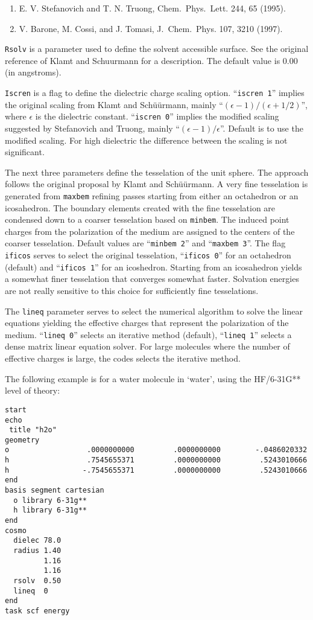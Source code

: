 \begin{enumerate}
\item E. V. Stefanovich and T. N. Truong, Chem.~Phys.~Lett. 244, 65 (1995).
\item V. Barone, M. Cossi, and J. Tomasi, J.~Chem.~Phys. 107, 3210 (1997).
\end{enumerate}

\verb+Rsolv+ is a parameter used to define the solvent accessible
surface. See the original reference of Klamt and Schuurmann for a
description. The default value is 0.00 (in angstroms).

\verb+Iscren+ is a flag to define the dielectric charge scaling option.
``{\tt iscren 1}'' implies the original scaling from Klamt and Sch\"{u}\"{u}rmann,
mainly ``$(\epsilon-1)/(\epsilon+1/2)$'', where $\epsilon$ is the dielectric constant.
``{\tt iscren 0}'' implies the modified scaling suggested by Stefanovich and
Truong, mainly ``$(\epsilon-1)/\epsilon$''. Default is to use the modified scaling.
For high dielectric the difference between the scaling is not 
significant.

The next three parameters define the tesselation of the unit sphere.
The approach follows the original proposal by Klamt and Sch\"{u}\"{u}rmann.
A very fine tesselation is generated from \verb+maxbem+ refining 
passes starting from either an octahedron or an icosahedron. The
boundary elements created with the fine tesselation are condensed
down to a coarser tesselation based on \verb+minbem+. The induced
point charges from the polarization of the medium are assigned to
the centers of the coarser tesselation. Default values are
``{\tt minbem 2}'' and ``{\tt maxbem 3}''. The flag \verb+ificos+ serves to
select the original tesselation, ``{\tt ificos 0}'' for an octahedron
(default) and ``{\tt ificos 1}'' for an icoshedron. Starting from an icosahedron
yields a somewhat finer tesselation that converges somewhat faster.
Solvation energies are not really sensitive to this choice for
sufficiently fine tesselations.

The \verb+lineq+ parameter serves to select the numerical algorithm to solve
the linear equations yielding the effective charges that represent
the polarization of the medium. ``{\tt lineq 0}'' selects an iterative method 
(default), ``{\tt lineq 1}'' selects a dense matrix linear equation solver.
For large molecules where the number of effective charges is large,
the codes selects the iterative method.

The following example is for a water molecule in `water', using
the HF/6-31G** level of theory:

\begin{verbatim}
start
echo
 title "h2o"
geometry
o                  .0000000000         .0000000000        -.0486020332
h                  .7545655371         .0000000000         .5243010666
h                 -.7545655371         .0000000000         .5243010666
end
basis segment cartesian
  o library 6-31g**
  h library 6-31g**
end
cosmo
  dielec 78.0
  radius 1.40
         1.16
         1.16
  rsolv  0.50
  lineq  0
end
task scf energy
\end{verbatim}
